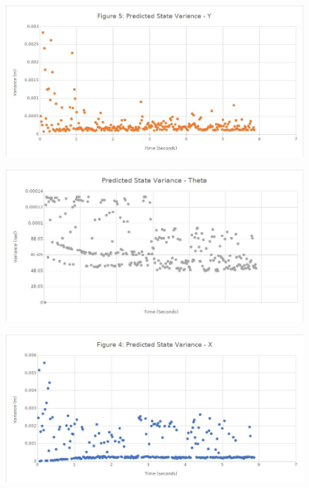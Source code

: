 \documentclass[journal]{IEEEtran}
\begin{document}
\begin{figure}[!t]%
\centering
\includegraphics[width=0.9\linewidth]{Figures/5-pred-state-var-y.jpg}
\caption{}
\label{fig:5}
\end{figure}

\begin{figure}[!t]%
\centering
\includegraphics[width=0.9\linewidth]{Figures/6-pred-state-var-theta.jpg}
\caption{}
\label{fig:6}
\end{figure}

\begin{figure}[!t]%
\centering
\includegraphics[width=0.9\linewidth]{Figures/7-landmarks-over-time.jpg}
\caption{}
\label{fig:7}
\end{figure}
\end{document}
